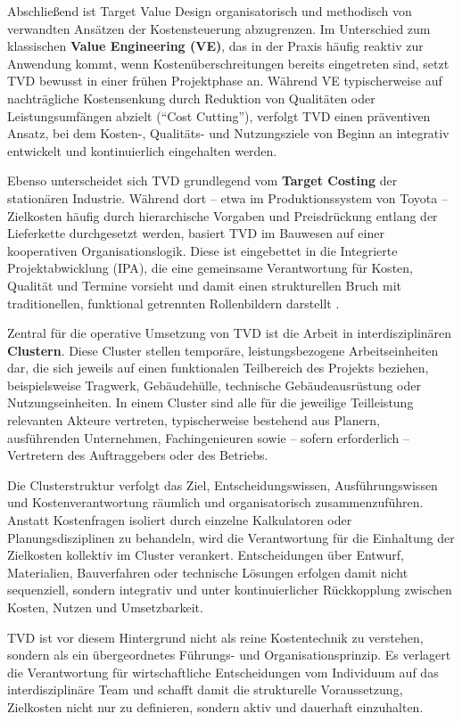 Abschließend ist Target Value Design organisatorisch und methodisch von verwandten Ansätzen der Kostensteuerung abzugrenzen. Im Unterschied zum klassischen \textbf{Value Engineering (VE)}, das in der Praxis häufig reaktiv zur Anwendung kommt, wenn Kostenüberschreitungen bereits eingetreten sind, setzt \acs{TVD} bewusst in einer frühen Projektphase an. Während VE typischerweise auf nachträgliche Kostensenkung durch Reduktion von Qualitäten oder Leistungsumfängen abzielt (\enquote{Cost Cutting}), verfolgt \acs{TVD} einen präventiven Ansatz, bei dem Kosten-, Qualitäts- und Nutzungsziele von Beginn an integrativ entwickelt und kontinuierlich eingehalten werden.\autocite[Vgl.][S.~15]{hill_target_2017}

Ebenso unterscheidet sich \acs{TVD} grundlegend vom \textbf{Target Costing} der stationären Industrie. Während dort – etwa im Produktionssystem von Toyota – Zielkosten häufig durch hierarchische Vorgaben und Preisdrückung entlang der Lieferkette durchgesetzt werden, basiert \acs{TVD} im Bauwesen auf einer kooperativen Organisationslogik. Diese ist eingebettet in die Integrierte Projektabwicklung (\acs{IPA}), die eine gemeinsame Verantwortung für Kosten, Qualität und Termine vorsieht und damit einen strukturellen Bruch mit traditionellen, funktional getrennten Rollenbildern darstellt \autocite[Vgl.][S.~7--9]{tommelein_target_2016}.

Zentral für die operative Umsetzung von \acs{TVD} ist die Arbeit in interdisziplinären \textbf{Clustern}. Diese Cluster stellen temporäre, leistungsbezogene Arbeitseinheiten dar, die sich jeweils auf einen funktionalen Teilbereich des Projekts beziehen, beispielsweise Tragwerk, Gebäudehülle, technische Gebäudeausrüstung oder Nutzungseinheiten. In einem Cluster sind alle für die jeweilige Teilleistung relevanten Akteure vertreten, typischerweise bestehend aus Planern, ausführenden Unternehmen, Fachingenieuren sowie – sofern erforderlich – Vertretern des Auftraggebers oder des Betriebs.\autocite[Vgl.][S.~49--60]{hill_target_2017}


Die Clusterstruktur verfolgt das Ziel, Entscheidungswissen, Ausführungswissen und Kostenverantwortung räumlich und organisatorisch zusammenzuführen. Anstatt Kostenfragen isoliert durch einzelne Kalkulatoren oder Planungsdisziplinen zu behandeln, wird die Verantwortung für die Einhaltung der Zielkosten kollektiv im Cluster verankert. Entscheidungen über Entwurf, Materialien, Bauverfahren oder technische Lösungen erfolgen damit nicht sequenziell, sondern integrativ und unter kontinuierlicher Rückkopplung zwischen Kosten, Nutzen und Umsetzbarkeit.\autocite[Vgl.][S.~36--38]{hill_target_2017}


\acs{TVD} ist vor diesem Hintergrund nicht als reine Kostentechnik zu verstehen, sondern als ein übergeordnetes Führungs- und Organisationsprinzip. Es verlagert die Verantwortung für wirtschaftliche Entscheidungen vom Individuum auf das interdisziplinäre Team und schafft damit die strukturelle Voraussetzung, Zielkosten nicht nur zu definieren, sondern aktiv und dauerhaft einzuhalten.\autocite[Vgl.][S.~15--16]{hill_target_2017}
